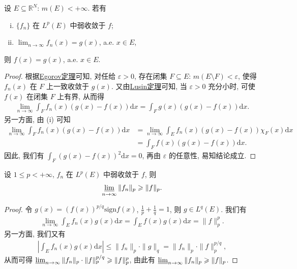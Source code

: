 \documentclass[../../main.tex]{subfiles}%
\begin{document}
\begin{theorem}
设 $E\subseteq\mathbb{R}^N$: $m(E)<+\infty$. 若有
\begin{enumerate}[(i)]
\item $\{f_n\}$ 在 $L^p(E)$ 中弱收敛于 $f$;
\item $\lim_{n\to\infty}f_n(x)=g(x)$, a.e. $x\in E$,
\end{enumerate}
则 $f(x)=g(x)$, a.e. $x\in E$.
\end{theorem}

\begin{proof}

根据\hyperref[theorem:Egorov定理]{Egorov定理}可知, 对任给 $\varepsilon>0$, 存在闭集 $F\subseteq E$: $m(E\setminus F)<\varepsilon$, 使得 $f_n(x)$ 在 $F$ 上一致收敛于 $g(x)$. 又由\hyperref[theorem:Lusin(卢津)定理]{Lusin定理}可知, 当 $\varepsilon>0$ 充分小时, 可使 $f(x)$ 在闭集 $F$ 上有界, 从而得
\begin{align*}
\lim_{n\to\infty}\int_F f_n(x)(g(x)-f(x))\mathrm{d}x=\int_F g(x)(g(x)-f(x))\mathrm{d}x.
\end{align*}
另一方面, 由 (i) 可知
\begin{align*}
\lim_{n\to\infty}\int_F f_n(x)(g(x)-f(x))\mathrm{d}x
&=\lim_{n\to\infty}\int_E f_n(x)(g(x)-f(x))\chi_F(x)\mathrm{d}x \\
&=\int_F f(x)(g(x)-f(x))\mathrm{d}x.
\end{align*}
因此, 我们有 $\int_F (g(x)-f(x))^2\mathrm{d}x=0$, 再由 $\varepsilon$ 的任意性, 易知结论成立.

\end{proof}

\begin{theorem}
设 $1\leqslant p<+\infty$, $f_n$ 在 $L^p(E)$ 中弱收敛于 $f$, 则
\begin{align*}
\varliminf_{n\to\infty}\|f_n\|_p\geqslant\|f\|_p.
\end{align*}
\end{theorem}
\begin{proof}

令 $g(x)=(f(x))^{p/q}\mathrm{sign}f(x)$, $\frac{1}{p}+\frac{1}{q}=1$, 则 $g\in L^q(E)$. 我们有
\begin{align*}
\lim_{n\to\infty}\int_E f_n(x)g(x)\mathrm{d}x=\int_E f(x)g(x)\mathrm{d}x=\|f\|_p^p.
\end{align*}
另一方面, 我们又有
\begin{align*}
\left|\int_E f_n(x)g(x)\mathrm{d}x\right|\leqslant\|f_n\|_p\cdot\|g\|_q=\|f_n\|_p\cdot\|f\|_p^{p/q},
\end{align*}
从而可得 $\varliminf_{n\to\infty}\|f_n\|_p\cdot\|f\|_p^{p/q}\geqslant\|f\|_p^p$, 由此有 $\varliminf_{n\to\infty}\|f_n\|_p\geqslant\|f\|_p$.

\end{proof}
\end{document}
